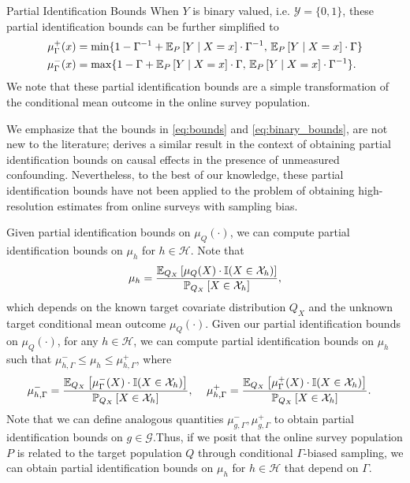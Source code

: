 \begin{subsection}{Partial Identification Bounds}
When $Y$ is binary valued, i.e. $\mathcal{Y} = \{0, 1\}$, these partial identification bounds can be further simplified to
\begin{equation} 
\label{eq:binary_bounds}
\begin{split}
\mu_{\Gamma}^{+}(x) &= \min\{1 - \Gamma^{-1} + \EE[P]{Y \mid X=x} \cdot \Gamma^{-1},\, \EE[P]{Y \mid X=x}  \cdot \Gamma\} \\
\mu_{\Gamma}^{-}(x) &= \max\{ 1 -  \Gamma + \EE[P]{Y \mid X=x} \cdot \Gamma,\, \EE[P]{Y \mid X=x}  \cdot \Gamma^{-1} \}.
\end{split}
\end{equation}
We note that these partial identification bounds are a simple transformation of the conditional mean outcome in the online survey population.

We emphasize that the bounds in \eqref{eq:bounds} and \eqref{eq:binary_bounds}, are not new to the literature; \citet{dorn2024doubly} derives a similar result in the context of obtaining partial identification bounds on causal effects in the presence of unmeasured confounding. Nevertheless, to the best of our knowledge, these partial identification bounds have not been applied to the problem of obtaining high-resolution estimates from online surveys with sampling bias.

Given partial identification bounds on $\mu_{Q}(\cdot)$, we can compute partial identification bounds on $\mu_{h}$ for $h \in \mathcal{H}.$ Note that
\begin{equation}
\mu_{h} = \frac{\EE[Q_{X}]{\mu_{Q}(X) \cdot \mathbb{I}(X \in \mathcal{X}_{h}) }}{\PP[Q_{X}]{X \in \mathcal{X}_{h}}},
\end{equation}
which depends on the known target covariate distribution $Q_{X}$ and the unknown target conditional mean outcome $\mu_{Q}(\cdot)$. Given our partial identification bounds on $\mu_{Q}(\cdot)$, for any $h \in \mathcal{H}$, we can compute partial identification bounds on $\mu_{h}$ such that $\mu_{h, \Gamma}^{-} \leq \mu_{h} \leq \mu_{h, \Gamma}^{+}$, where
\begin{equation}
\begin{split}
\mu_{h, \Gamma}^{-} = \frac{\EE[Q_{X}]{\mu_{\Gamma}^{-}(X) \cdot \mathbb{I}(X \in \mathcal{X}_{h}) }}{\PP[Q_{X}]{X \in \mathcal{X}_{h}}},\, \quad \mu_{h, \Gamma}^{+} &= \frac{\EE[Q_{X}]{\mu_{\Gamma}^{+}(X) \cdot \mathbb{I}(X \in \mathcal{X}_{h}) }}{\PP[Q_{X}]{X \in \mathcal{X}_{h}}}.
\end{split}
\end{equation}
Note that we can define analogous quantities $\mu_{g, \Gamma}^{-}, \mu_{g, \Gamma}^{+}$ to obtain partial identification bounds on $g \in \mathcal{G}.$Thus, if we posit that the online survey population $P$ is related to the target population $Q$ through conditional $\Gamma$-biased sampling, we can obtain partial identification bounds on $\mu_{h}$ for $h \in \mathcal{H}$ that depend on $\Gamma$.
\end{subsection}

